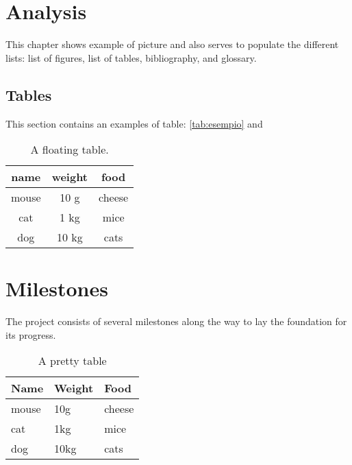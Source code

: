 \chapter{Analysis}
\label{chap:analysis}

\lipsum[1]

\minitoc

\newpage

This chapter shows example of picture and also serves to populate the different lists: list of figures, list of tables, bibliography, and glossary.

\section{Tables}

This section contains an examples of table: \autoref{tab:esempio} and 

\begin{table}[H]
	\centering
	\begin{tabular}{ccc}
		\toprule
		name & weight & food \\ 
		\midrule
		mouse	& 10 g	& cheese \\
		cat	& 1 kg	& mice \\
		dog	& 10 kg	& cats \\
		\bottomrule 
	\end{tabular}
	\caption[A floating table]{A floating table.}
	\label{tab:esempio}
\end{table}

\chapter{Milestones}
\label{chap:milestones}

The project consists of several milestones along the way to lay the foundation for its progress.

\begin{table}[H]
    \centering
	\begin{tabular}{|L{2.5cm}|L{2.5cm}|C{3cm}|}
		\hline
		 \textbf{\large{Name}} & \textbf{\large{Weight}} & \textbf{\large{Food}} \\
		\hline
		mouse & 10g & cheese \\
		\hline
            cat & 1kg & mice \\
		\hline
            dog & 10kg & cats \\
		\hline
	\end{tabular}
	\caption{A pretty table}
\end{table}

